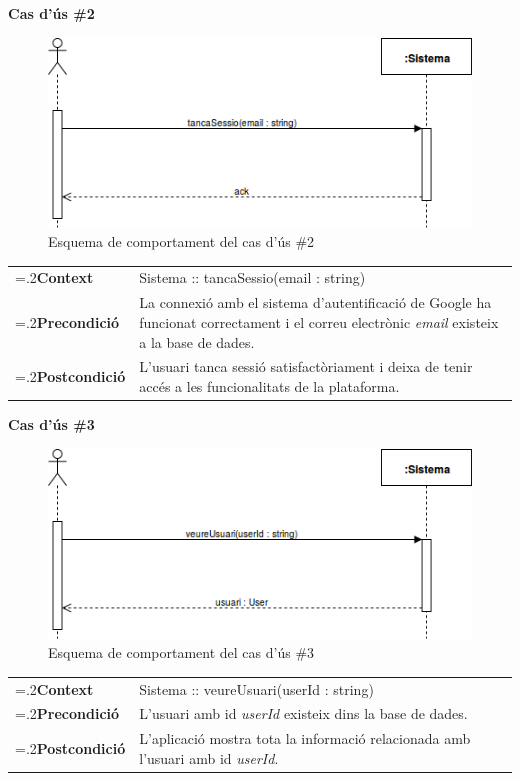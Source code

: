 \noindent\textbf{\large Cas d'ús \#2}\\
\begin{figure}[H]
\centering
\includegraphics[scale=0.6]{Figures/casdus_02.png}
\caption{Esquema de comportament del cas d'ús \#2}
\end{figure}
\begin{table}[h]
\noindent
\begin{tabularx}{\linewidth}{
>{\hsize=.2\hsize}X%
>{\hsize=0.8\hsize}X%
}
\textbf{Context} 		& Sistema :: tancaSessio(email : string) \\
\textbf{Precondició} 	& La connexió amb el sistema d'autentificació de Google ha funcionat correctament i el correu electrònic \textit{email} existeix a la base de dades. \\
\textbf{Postcondició}	& L'usuari tanca sessió satisfactòriament i deixa de tenir accés a les funcionalitats de la plataforma. \\
\end{tabularx}
\label{}
\end{table}

\clearpage
\noindent\textbf{\large Cas d'ús \#3}\\
\begin{figure}[H]
\centering
\includegraphics[scale=0.6]{Figures/casdus_03.png}
\caption{Esquema de comportament del cas d'ús \#3}
\end{figure}
\begin{table}[h]
\noindent
\begin{tabularx}{\linewidth}{
>{\hsize=.2\hsize}X%
>{\hsize=0.8\hsize}X%
}
\textbf{Context} 		& Sistema :: veureUsuari(userId : string) \\
\textbf{Precondició} 	& L'usuari amb id \textit{userId} existeix dins la base de dades. \\
\textbf{Postcondició}	& L'aplicació mostra tota la informació relacionada amb l'usuari amb id \textit{userId}. \\
\end{tabularx}
\label{}
\end{table}

